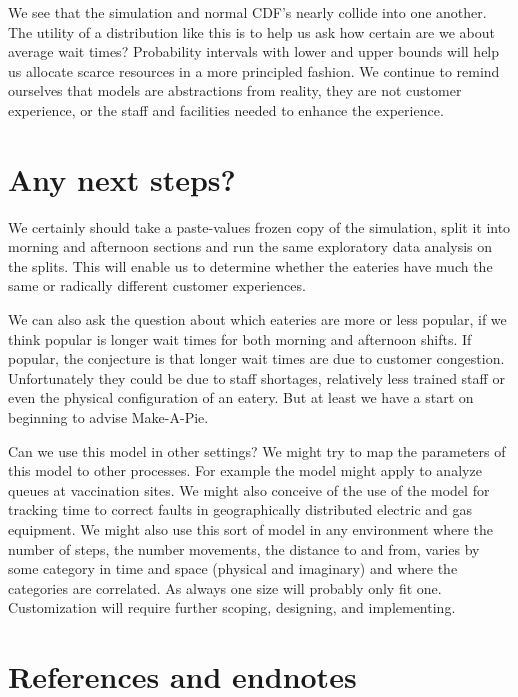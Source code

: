 \documentclass[
]{book}
\begin{document}
We see that the simulation and normal CDF's nearly collide into one another. The utility of a distribution like this is to help us ask how certain are we about average wait times? Probability intervals with lower and upper bounds will help us allocate scarce resources in a more principled fashion. We continue to remind ourselves that models are abstractions from reality, they are not customer experience, or the staff and facilities needed to enhance the experience.

\hypertarget{any-next-steps}{%
\section{Any next steps?}\label{any-next-steps}}

We certainly should take a paste-values frozen copy of the simulation, split it into morning and afternoon sections and run the same exploratory data analysis on the splits. This will enable us to determine whether the eateries have much the same or radically different customer experiences.

We can also ask the question about which eateries are more or less popular, if we think popular is longer wait times for both morning and afternoon shifts. If popular, the conjecture is that longer wait times are due to customer congestion. Unfortunately they could be due to staff shortages, relatively less trained staff or even the physical configuration of an eatery. But at least we have a start on beginning to advise Make-A-Pie.

Can we use this model in other settings? We might try to map the parameters of this model to other processes. For example the model might apply to analyze queues at vaccination sites. We might also conceive of the use of the model for tracking time to correct faults in geographically distributed electric and gas equipment. We might also use this sort of model in any environment where the number of steps, the number movements, the distance to and from, varies by some category in time and space (physical and imaginary) and where the categories are correlated. As always one size will probably only fit one. Customization will require further scoping, designing, and implementing.

\hypertarget{references-and-endnotes}{%
\section{References and endnotes}\label{references-and-endnotes}}
\end{document}
